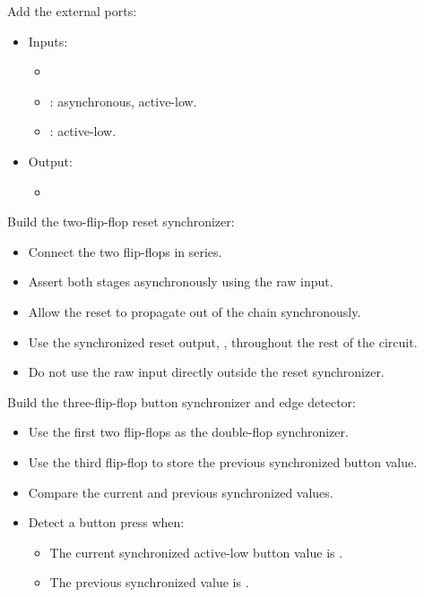 \begin{parts}
  \item Add the external ports:
    \begin{itemize}
      \item Inputs:
        \begin{itemize}
          \item {}
          \item {}: asynchronous, active-low.
          \item {}: active-low.
        \end{itemize}
      \item Output:
        \begin{itemize}
          \item {}
        \end{itemize}
    \end{itemize}
  \item Build the two-flip-flop reset synchronizer:
    \begin{itemize}
      \item Connect the two flip-flops in series.
      \item Assert both stages asynchronously using the raw  input.
      \item Allow the reset to propagate out of the chain synchronously.
      \item Use the synchronized reset output, , throughout the rest of the
        circuit.
      \item Do not use the raw  input directly outside the reset synchronizer.
    \end{itemize}
  \item Build the three-flip-flop button synchronizer and edge detector:
    \begin{itemize}
      \item Use the first two flip-flops as the double-flop synchronizer.
      \item Use the third flip-flop to store the previous synchronized button value.
      \item Compare the current and previous synchronized values.
      \item Detect a button press when:
        \begin{itemize}
          \item The current synchronized active-low button value is .
          \item The previous synchronized value is .

\end{itemize}
\end{itemize}
\end{parts}
